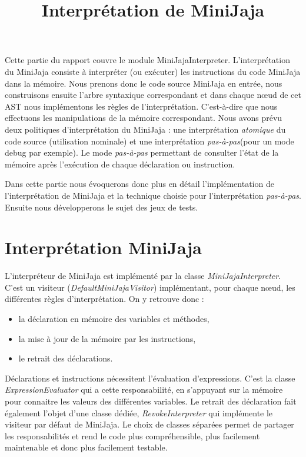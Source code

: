 \documentclass[a4paper,12pt]{article}
\title{Interprétation de MiniJaja}
\begin{document}
\maketitle
Cette partie du rapport couvre le module MiniJajaInterpreter. L'interprétation du MiniJaja consiste à interpréter (ou exécuter) les instructions du code MiniJaja dans la mémoire. Nous prenons donc le code source MiniJaja en entrée, nous construisons ensuite l'arbre syntaxique correspondant et dans chaque nœud de cet AST nous implémentons les règles de l'interprétation. 
C'est-à-dire que nous effectuons les manipulations de la mémoire correspondant. 
Nous avons prévu deux politiques d'interprétation du MiniJaja : une interprétation \emph{atomique} du code source (utilisation nominale) et une interprétation \emph{pas-à-pas}(pour un mode debug par exemple). Le mode \emph{pas-à-pas} permettant de consulter l'état de la mémoire après l'exécution de chaque déclaration ou instruction. 

Dans cette partie nous évoquerons donc plus en détail l'implémentation de l'interprétation de MiniJaja et la technique choisie pour l'interprétation \emph{pas-à-pas}. 
Ensuite nous développerons le sujet des jeux de tests. 

\section{Interprétation MiniJaja}

L'interpréteur de MiniJaja est implémenté par la classe \emph{MiniJajaInterpreter}. C'est un visiteur (\emph{DefaultMiniJajaVisitor}) implémentant, pour chaque nœud, les différentes règles d'interprétation. On y retrouve donc :

\begin{itemize}
\item la déclaration en mémoire des variables et méthodes,
\item la mise à jour de la mémoire par les instructions,
\item le retrait des déclarations.
\end{itemize}

Déclarations et instructions nécessitent l'évaluation d'expressions. C'est la classe \emph{ExpressionEvaluator} qui a cette responsabilité, en s'appuyant sur la mémoire pour connaitre les valeurs des différentes variables. 
Le retrait des déclaration fait également l'objet d'une classe dédiée, \emph{RevokeInterpreter} qui implémente le visiteur par défaut de MiniJaja.
Le choix de classes séparées permet de partager les responsabilités et rend le code plus compréhensible, plus facilement maintenable et donc plus facilement testable.
\end{document}
